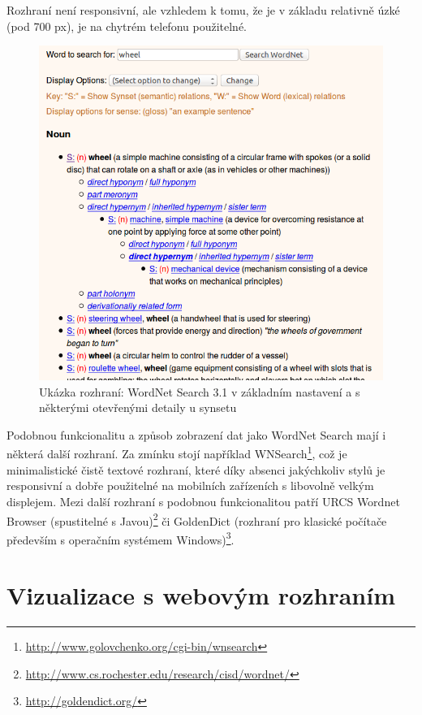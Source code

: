 \documentclass[a4paper, 11pt, oneside]{book}
\begin{document}
				Rozhraní není responsivní, ale vzhledem k tomu, že je v základu relativně úzké (pod 700 px), je na chytrém telefonu použitelné.

				\begin{figure}[h]
					\centering
					\includegraphics[width=1.0\textwidth]{wnsearch.png}
					\caption{Ukázka rozhraní: WordNet Search 3.1 v základním nastavení a s některými otevřenými detaily u synsetu}
					\label{fig:wnsearch}
				\end{figure}

				Podobnou funkcionalitu a způsob zobrazení dat jako WordNet Search mají i některá další rozhraní. Za zmínku stojí například WNSearch\footnote{\url{http://www.golovchenko.org/cgi-bin/wnsearch}}, což je minimalistické čistě textové rozhraní, které díky absenci jakýchkoliv stylů je responsivní a dobře použitelné na mobilních zařízeních s libovolně velkým displejem. Mezi další rozhraní s podobnou funkcionalitou patří URCS Wordnet Browser (spustitelné s Javou)\footnote{\url{http://www.cs.rochester.edu/research/cisd/wordnet/}} či GoldenDict (rozhraní pro klasické počítače především s operačním systémem Windows)\footnote{\url{http://goldendict.org/}}.

			\section{Vizualizace s webovým rozhraním}
\end{document}
